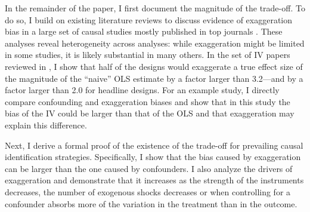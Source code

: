 			In the remainder of the paper, I first document the magnitude of the trade-off. To do so, I build on existing literature reviews to discuss evidence of exaggeration bias in a large set of causal studies mostly published in top journals \citep{brodeur_methods_2020, youngConsistencyInferenceInstrumental2022, bagilet_accurate_2023, lalHow2024}. %
			These analyses reveal heterogeneity across analyses: while exaggeration might be limited in some studies, it is likely substantial in many others. 
			In the set of IV papers reviewed in \cite{youngConsistencyInferenceInstrumental2022}, I show that 
			half of the designs would exaggerate a true effect size of the magnitude of the ``naive'' OLS estimate by a factor larger than 3.2---and by a factor larger than 2.0 for headline designs. %
			For an example study, I directly compare confounding and exaggeration biases and show that in this study the bias of the IV could be larger than that of the OLS and that exaggeration may explain this difference. 
			
			Next, I derive a formal proof of the existence of the trade-off for prevailing causal identification strategies. Specifically, I show that the bias caused by exaggeration can be larger than the one caused by confounders. I also analyze the drivers of exaggeration and demonstrate that it increases as the strength of the instruments decreases, the number of exogenous shocks decreases or when controlling for a confounder absorbs more of the variation in the treatment than in the outcome. 
			
